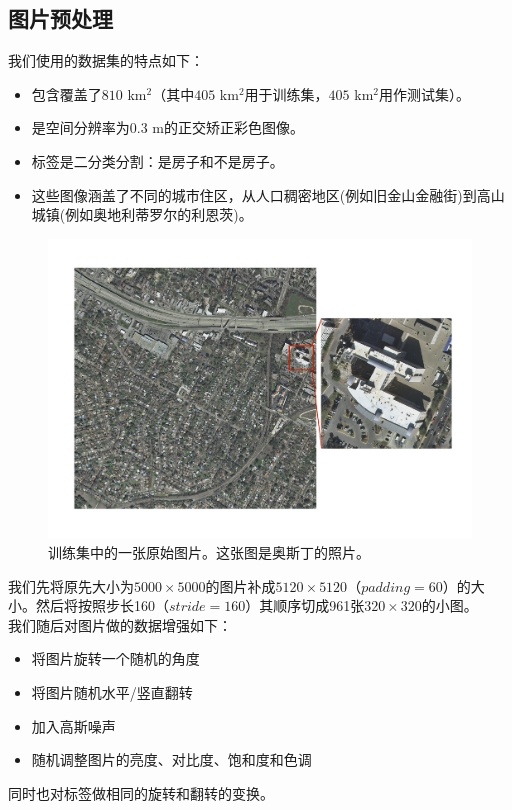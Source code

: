 \documentclass[a4paper,12pt]{article}
\begin{document}
\begin{CJK*}{UTF8}{gbsn}
\begin{spacing}{1.2}
    \section{图片预处理}
    我们使用的数据集的特点如下：
    \begin{itemize}
        \item 包含覆盖了$810$ km$^2$（其中$405$ km$^2$用于训练集，$405$ km$^2$用作测试集）。
        \item 是空间分辨率为$0.3$ m的正交矫正彩色图像。
        \item 标签是二分类分割：是房子和不是房子。
        \item 这些图像涵盖了不同的城市住区，从人口稠密地区(例如旧金山金融街)到高山城镇(例如奥地利蒂罗尔的利恩茨)。
    \end{itemize}
    \begin{figure} [!]
    \centering
    \includegraphics[width=12.0cm]{Austin.pdf}
    \caption{训练集中的一张原始图片。这张图是奥斯丁的照片。}
    \label{fig:Fig 1}
    \end{figure}
    我们先将原先大小为$5000\times5000$的图片补成$5120\times5120$（$padding=60$）的大小。然后将按照步长160（$stride=160$）其顺序切成961张$320\times320$的小图。\\
    我们随后对图片做的数据增强如下：
    \begin{itemize}
        \item 将图片旋转一个随机的角度
        \item 将图片随机水平/竖直翻转
        \item 加入高斯噪声
        \item 随机调整图片的亮度、对比度、饱和度和色调
    \end{itemize}
    同时也对标签做相同的旋转和翻转的变换。\\

\end{spacing}
\end{CJK*}
\end{document}
